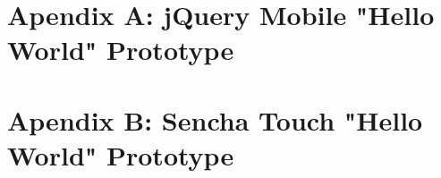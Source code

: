 \documentclass[a4paper,12pt]{book}
\begin{document}

\chapter{Apendix A: jQuery Mobile "Hello World" Prototype}
\label{Apendix A: jQuery Mobile "Hello World" Prototype}


\chapter{Apendix B: Sencha Touch "Hello World" Prototype}
\label{Apendix B: Sencha Touch "Hello World" Prototype}

\end{document}
